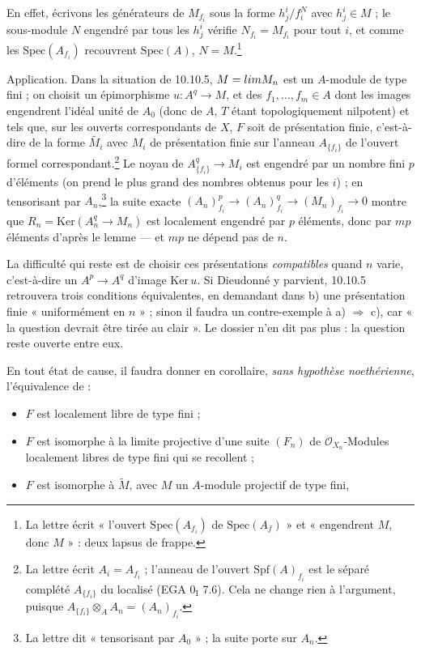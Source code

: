 \documentclass[11pt,a4paper]{article}
\begin{document}
En effet, écrivons les générateurs de $M_{f_i}$ sous la forme $h^i_j /
f_i^{N}$ avec $h^i_j \in M$ ; le sous-module $N$ engendré par tous les
$h^i_j$ vérifie $N_{f_i} = M_{f_i}$ pour tout $i$, et comme les
$\mathrm{Spec}(A_{f_i})$ recouvrent $\mathrm{Spec}(A)$, $N = M$.\footnote{La
lettre écrit « l'ouvert $\mathrm{Spec}(A_{f_i})$ de $\mathrm{Spec}(A_f)$ » et
« engendrent $M$, donc $M$ » : deux lapsus de frappe.}

Application. Dans la situation de 10.10.5, $M = \varprojlim M_n$ est un
$A$-module de type fini ; on choisit un épimorphisme $u : A^q \to M$, et des
$f_1, \ldots, f_m \in A$ dont les images engendrent l'idéal unité de $A_0$
(donc de $A$, $T$ étant topologiquement nilpotent) et tels que, sur les
ouverts correspondants de $X$, $F$ soit de présentation finie, c'est-à-dire
de la forme $\widetilde{M_i}$ avec $M_i$ de présentation finie sur l'anneau
$A_{\{f_i\}}$ de l'ouvert formel correspondant.\footnote{La lettre écrit
$A_i = A_{f_i}$ ; l'anneau de l'ouvert $\mathrm{Spf}(A)_{f_i}$ est le séparé
complété $A_{\{f_i\}}$ du localisé (EGA $0_{\mathrm{I}}$ 7.6). Cela ne change
rien à l'argument, puisque $A_{\{f_i\}} \otimes_A A_n = (A_n)_{f_i}$.}
Le noyau de $A_{\{f_i\}}^q \to M_i$ est engendré par un nombre fini $p$
d'éléments (on prend le plus grand des nombres obtenus pour les $i$) ; en
tensorisant par $A_n$,\footnote{La lettre dit « tensorisant par $A_0$ » ; la
suite porte sur $A_n$.}
la suite exacte $(A_n)_{f_i}^p \to (A_n)_{f_i}^q \to (M_n)_{f_i} \to 0$ montre
que $R_n = \mathrm{Ker}(A_n^q \to M_n)$ est localement engendré par $p$
éléments, donc par $mp$ éléments d'après le lemme --- et $mp$ ne dépend pas
de $n$.

La difficulté qui reste est de choisir ces présentations \emph{compatibles}
quand $n$ varie, c'est-à-dire un $A^p \to A^q$ d'image $\mathrm{Ker}\, u$. Si
Dieudonné y parvient, 10.10.5 retrouvera trois conditions équivalentes, en
demandant dans b) une présentation finie « uniformément en $n$ » ; sinon il
faudra un contre-exemple à a) $\Rightarrow$ c), car « la question devrait être
tirée au clair ». Le dossier n'en dit pas plus : la question reste ouverte
entre eux.

En tout état de cause, il faudra donner en corollaire, \emph{sans hypothèse
noethérienne}, l'équivalence de :

\begin{itemize}
\item[a)] $F$ est localement libre de type fini ;
\item[b)] $F$ est isomorphe à la limite projective d'une suite $(F_n)$ de
$\mathcal{O}_{X_n}$-Modules localement libres de type fini qui se recollent ;
\item[c)] $F$ est isomorphe à $\widetilde{M}$, avec $M$ un $A$-module
projectif de type fini,
\end{itemize}
\end{document}
